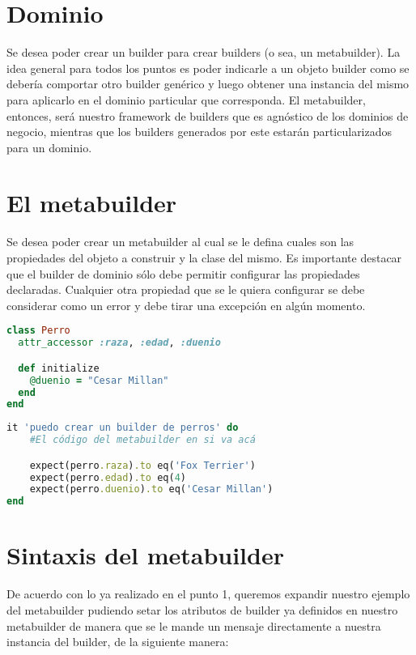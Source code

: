 \documentclass[spanish,a4paper]{article}
\begin{document}
\maketitle

\section*{Dominio}
Se desea poder crear un builder para crear builders (o sea, un metabuilder). La idea general para todos los puntos es poder indicarle a un objeto builder como se debería comportar otro builder genérico y luego obtener una instancia del mismo para aplicarlo en el dominio particular que corresponda.
El metabuilder, entonces, será nuestro framework de builders que es agnóstico de los dominios de negocio, mientras que los builders generados por este estarán particularizados para un dominio.
\section{El metabuilder}

Se desea poder crear un metabuilder al cual se le defina cuales son las propiedades del objeto a construir y la clase del mismo.
Es importante destacar que el builder de dominio sólo debe permitir configurar las propiedades declaradas. Cualquier otra propiedad que se le quiera configurar se debe considerar como un error y debe tirar una excepción en algún momento.

  \begin{lstlisting}[language=Ruby]
class Perro
  attr_accessor :raza, :edad, :duenio

  def initialize
    @duenio = "Cesar Millan"
  end
end
  \end{lstlisting}
  
  \begin{lstlisting}[language=Ruby]
it 'puedo crear un builder de perros' do
    #El código del metabuilder en si va acá

    expect(perro.raza).to eq('Fox Terrier')
    expect(perro.edad).to eq(4)
    expect(perro.duenio).to eq('Cesar Millan')
end
  \end{lstlisting}

\section{Sintaxis del metabuilder}
De acuerdo con lo ya realizado en el punto 1, queremos expandir nuestro ejemplo del metabuilder pudiendo setar los atributos de builder ya definidos
en nuestro metabuilder de manera que se le mande un mensaje directamente a nuestra instancia del builder, de la siguiente manera:
\end{document}
